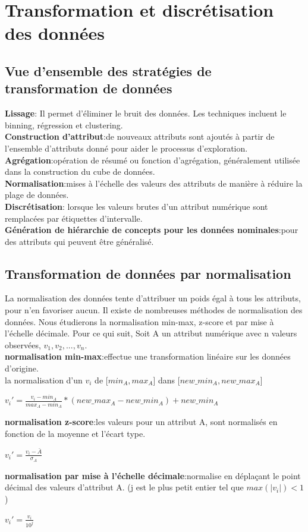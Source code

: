 \documentclass[12pt,a4paper,oneside]{book}
\begin{document}
\section{Transformation et discrétisation des données}
\subsection{Vue d'ensemble des stratégies de transformation de données}
\textbf{Lissage}: Il permet d'éliminer le bruit des données. Les techniques incluent le binning,
régression et clustering.\\
\textbf{Construction d'attribut}:de nouveaux attributs sont ajoutés à partir de l'ensemble d'attributs donné pour aider le processus d'exploration.\\
\textbf{Agrégation}:opération de résumé ou fonction d'agrégation, généralement utilisée dans la construction du cube de données.\\
\textbf{Normalisation}:mises à l'échelle des valeurs des attributs de manière à réduire la plage de données.\\
\textbf{Discrétisation}: lorsque les valeurs brutes d'un attribut numérique sont remplacées par étiquettes d'intervalle.\\
\textbf{Génération de hiérarchie de concepts pour les données nominales}:pour des attributs qui peuvent être généralisé.

\subsection{Transformation de données par normalisation}
La normalisation des données tente d'attribuer un poids égal à tous les attributs, pour n'en favoriser aucun. Il existe de nombreuses méthodes de normalisation des données. Nous étudierons la normalisation min-max, z-score et par mise à l'échelle décimale. Pour ce qui suit, Soit A un attribut numérique avec n valeurs observées, $v_{1},v_{2}, ... , v_{n}$.\\
\textbf{normalisation min-max}:effectue une transformation linéaire sur les données d'origine.\\
la normalisation d'un $v_{i}$ de [$min_{A},max_{A}$] dans [$new\_min_{A},new\_max_{A}$]
\begin{center}
	$v_{i}' = \frac{v_{i} - min_{A}}{max_{A} - min_{A}} * (new\_max_{A} - new\_min_{A}) + new\_min_{A}$
\end{center}
\textbf{normalisation z-score}:les valeurs pour un attribut A, sont normalisés en fonction de la moyenne et l'écart type.
\begin{center}
		$v_{i}' = \frac{v_{i} - \bar{A}}{\sigma_{A}}$
\end{center}
\textbf{normalisation par mise à l'échelle décimale}:normalise en déplaçant le point décimal des valeurs d'attribut A. (j est le plus petit entier tel que $max(|v_{i}|) <1$)
\begin{center}
	$v_{i}' = \frac{v_{i}}{10^{j}}$
\end{center}
\end{document}
